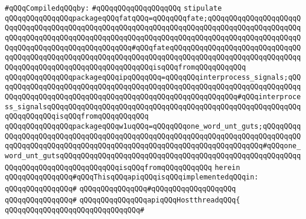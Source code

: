 \newline
\newline
\verb|#qQQqCompiledqQQqby:|\newline
\verb|#qQQqqQQqqQQqqQQqqQQq|\newline
\newline
\verb|stipulate|\newline
\verb|qQQqqQQqqQQqqQQqpackageqQQqfatqQQq=qQQqqQQqfate;qQQqqQQqqQQqqQQqqQQqqQQqqQQqqQQqqQQqqQQqqQQqqQQqqQQqqQQqqQQqqQQqqQQqqQQqqQQqqQQqqQQqqQQqqQQqqQQqqQQqqQQqqQQqqQQqqQQqqQQqqQQqqQQqqQQqqQQqqQQqqQQqqQQqqQQqqQQqqQQqqQQqqQQqqQQqqQQqqQQqqQQqqQQqqQQq#qQQqfateqQQqqQQqqQQqqQQqqQQqqQQqqQQqqQQqqQQqqQQqqQQqqQQqqQQqqQQqqQQqqQQqqQQqqQQqqQQqqQQqqQQqqQQqqQQqqQQqqQQqqQQqqQQqqQQqqQQqqQQqqQQqqQQqqQQqqQQqisqQQqfromqQQqqQQqqQQq|\newline
\verb|qQQqqQQqqQQqqQQqpackageqQQqipqQQqqQQq=qQQqqQQqinterprocess_signals;qQQqqQQqqQQqqQQqqQQqqQQqqQQqqQQqqQQqqQQqqQQqqQQqqQQqqQQqqQQqqQQqqQQqqQQqqQQqqQQqqQQqqQQqqQQqqQQqqQQqqQQqqQQqqQQqqQQqqQQqqQQqqQQq#qQQqinterprocess_signalsqQQqqQQqqQQqqQQqqQQqqQQqqQQqqQQqqQQqqQQqqQQqqQQqqQQqqQQqqQQqqQQqqQQqqQQqisqQQqfromqQQqqQQqqQQq|\newline
\verb|qQQqqQQqqQQqqQQqpackageqQQqw1uqQQq=qQQqqQQqone_word_unt_guts;qQQqqQQqqQQqqQQqqQQqqQQqqQQqqQQqqQQqqQQqqQQqqQQqqQQqqQQqqQQqqQQqqQQqqQQqqQQqqQQqqQQqqQQqqQQqqQQqqQQqqQQqqQQqqQQqqQQqqQQqqQQqqQQqqQQqqQQqqQQq#qQQqone_word_unt_gutsqQQqqQQqqQQqqQQqqQQqqQQqqQQqqQQqqQQqqQQqqQQqqQQqqQQqqQQqqQQqqQQqqQQqqQQqqQQqqQQqqQQqisqQQqfromqQQqqQQqqQQq|\newline
\verb|herein|\newline
\newline
\verb|qQQqqQQqqQQqqQQq#qQQqThisqQQqapiqQQqisqQQqimplementedqQQqin:|\newline
\verb|qQQqqQQqqQQqqQQq#|\newline
\verb|qQQqqQQqqQQqqQQq#qQQqqQQqqQQqqQQqqQQq|\newline
\verb|qQQqqQQqqQQqqQQq#|\newline
\verb|qQQqqQQqqQQqqQQqapiqQQqHostthreadqQQq{|\newline
\verb|qQQqqQQqqQQqqQQqqQQqqQQqqQQqqQQq#|\newline
